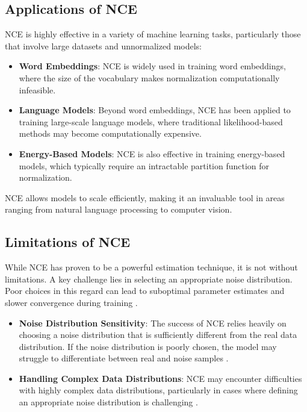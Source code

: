 \subsection{Applications of NCE}

NCE is highly effective in a variety of machine learning tasks, particularly those that involve large datasets and unnormalized models:
\begin{itemize}
    \item \textbf{Word Embeddings}: NCE is widely used in training word embeddings, where the size of the vocabulary makes normalization computationally infeasible.
    \item \textbf{Language Models}: Beyond word embeddings, NCE has been applied to training large-scale language models, where traditional likelihood-based methods may become computationally expensive.
    \item \textbf{Energy-Based Models}: NCE is also effective in training energy-based models, which typically require an intractable partition function for normalization.
\end{itemize}

NCE allows models to scale efficiently, making it an invaluable tool in areas ranging from natural language processing to computer vision.

\subsection{Limitations of NCE}

While NCE has proven to be a powerful estimation technique, it is not without limitations. A key challenge lies in selecting an appropriate noise distribution. Poor choices in this regard can lead to suboptimal parameter estimates and slower convergence during training \citep{10.48550/arxiv.2110.11271}.

\begin{itemize}
    \item \textbf{Noise Distribution Sensitivity}: The success of NCE relies heavily on choosing a noise distribution that is sufficiently different from the real data distribution. If the noise distribution is poorly chosen, the model may struggle to differentiate between real and noise samples \citep{10.48550/arxiv.2110.11271}.
    \item \textbf{Handling Complex Data Distributions}: NCE may encounter difficulties with highly complex data distributions, particularly in cases where defining an appropriate noise distribution is challenging \citep{10.48550/arxiv.2110.11271}.
\end{itemize}

